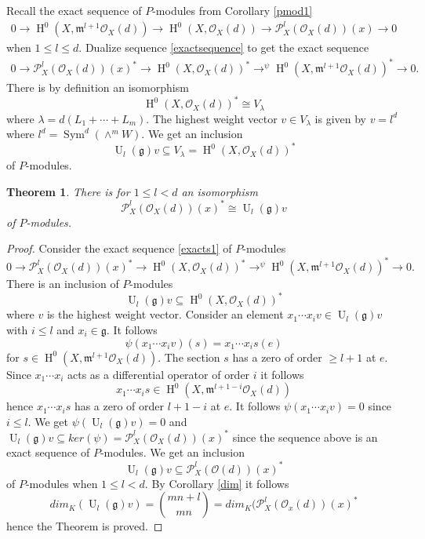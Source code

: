 \documentclass{amsart}
\theoremstyle{plain}
\newtheorem{theorem}{Theorem}[section]
\theoremstyle{definition}
\theoremstyle{remark}
\numberwithin{equation}{theorem}
\begin{document}
Recall the exact sequence of $P$-modules from Corollary \ref{pmod1}
\begin{align} \label{exactsequence}
0\rightarrow {\operatorname{H} }^0(X,{\mathfrak{m}}^{l+1}{\mathcal{O} }_X(d))\rightarrow
{\operatorname{H} }^0(X,{\mathcal{O} }_X(d))\rightarrow {\mathcal{P} }^l_X({\mathcal{O} }_X(d))(x)\rightarrow 0
\end{align}
when $1\leq l \leq d$.
Dualize sequence \ref{exactsequence} to get the exact sequence
\begin{align} \label{exacts1}
 0\rightarrow {\mathcal{P} }^l_X({\mathcal{O} }_X(d))(x)^*\rightarrow
{\operatorname{H} }^0(X,{\mathcal{O} }_X(d))^*\rightarrow^\psi {\operatorname{H} }^0(X,{\mathfrak{m}}^{l+1}{\mathcal{O} }_X(d))^*\rightarrow
0.
\end{align}
There is by definition an isomorphism
\[ {\operatorname{H} }^0(X,{\mathcal{O} }_X(d))^*\cong {V_\lambda} \]
where $\lambda=d(L_1+\cdots +L_m)$. The highest weight vector $v\in
{V_\lambda}$ is given by $v=l^d$ where $l^d={\operatorname{Sym} }^d(\wedge^m W)$. We get an
inclusion 
\[ {\operatorname{U}}_l({\mathfrak{g}})v\subseteq {V_\lambda}={\operatorname{H} }^0(X,{\mathcal{O} }_X(d))^*  \]
of $P$-modules.

\begin{theorem} \label{mainp} There is for $1\leq l <d$ an isomorphism
\[{\mathcal{P} }^l_X({\mathcal{O} }_X(d))(x)^*\cong {\operatorname{U}}_l({\mathfrak{g}})v \]
of $P$-modules.
\end{theorem}
\begin{proof}  Consider the exact sequence \ref{exacts1} of $P$-modules
\[ 0\rightarrow {\mathcal{P} }^l_X({\mathcal{O} }_X(d))(x)^*\rightarrow
{\operatorname{H} }^0(X,{\mathcal{O} }_X(d))^*\rightarrow^\psi {\operatorname{H} }^0(X,{\mathfrak{m}}^{l+1}{\mathcal{O} }_X(d))^*\rightarrow
0.\]
There is an inclusion of $P$-modules 
\[ {\operatorname{U}}_l({\mathfrak{g}})v\subseteq {\operatorname{H} }^0(X,{\mathcal{O} }_X(d))^* \]
where $v$ is the highest weight vector.
Consider an element $x_1\cdots x_iv\in {\operatorname{U}}_l({\mathfrak{g}})v$ with $i\leq l$ and
  $x_i\in  {\mathfrak{g}}$.  It follows
\[ \psi(x_1\cdots x_iv)(s)=x_1\cdots x_is(e) \]
for $s\in {\operatorname{H} }^0(X,{\mathfrak{m}}^{l+1}{\mathcal{O} }_X(d))$. The section $s$ has a zero of
order $\geq l+1$ at $e$. Since $x_1\cdots x_i$ acts as a differential
operator of order $i$ it follows
\[ x_1\cdots x_is\in {\operatorname{H} }^0(X,{\mathfrak{m}}^{l+1-i}{\mathcal{O} }_X(d)) \]
hence $x_1\cdots x_is$ has a zero of order $l+1-i$ at $e$. It follows 
$\psi(x_1\cdots x_iv)=0$ since $i\leq l$. We get $\psi({\operatorname{U}}_l({\mathfrak{g}})v)=0$ 
and ${\operatorname{U}}_l({\mathfrak{g}})v\subseteq ker(\psi)={\mathcal{P} }^l_X({\mathcal{O} }_X(d))(x)^*$ since the
sequence above is an exact sequence of $P$-modules.
We get an inclusion
\[ {\operatorname{U}}_l({\mathfrak{g}})v\subseteq {\mathcal{P} }^l_X({\mathcal{O} }(d))(x)^* \]
of $P$-modules when $1\leq l <d$.
By Corollary \ref{dim} it follows 
\[ dim_K({\operatorname{U}}_l({\mathfrak{g}})v)=\binom{mn+l}{mn}=dim_K({\mathcal{P} }^l_X({\mathcal{O} }_x(d))(x)^*\]
hence the Theorem is proved.
\end{proof}
\end{document}
